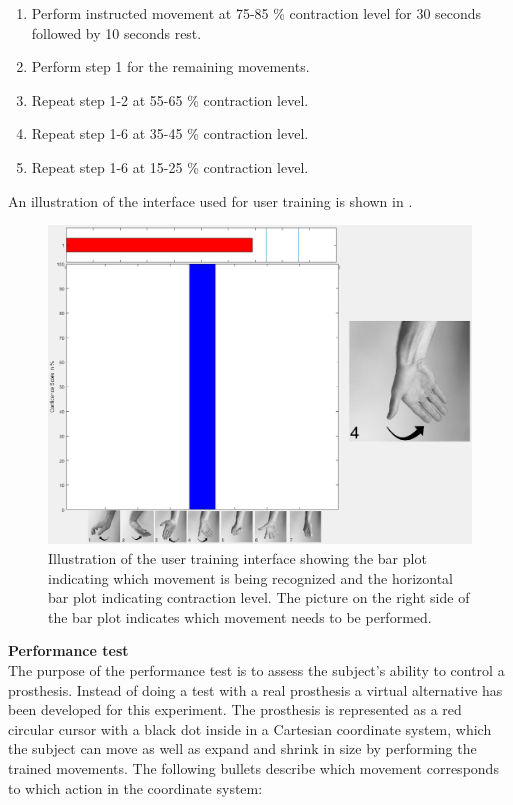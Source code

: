 \begin{enumerate}
	\item Perform instructed movement at 75-85 \% contraction level for 30 seconds followed by 10 seconds rest.
	\item Perform step 1 for the remaining movements.
	\item Repeat step 1-2 at 55-65 \% contraction level.
	\item Repeat step 1-6 at 35-45 \% contraction level.
	\item Repeat step 1-6 at 15-25 \% contraction level.
\end{enumerate} 

An illustration of the interface used for user training is shown in .

\begin{figure}[H]                 
	\includegraphics[width=.8\textwidth]{figures/xBackground/usertraincontrolGUI}  
	\caption{Illustration of the user training interface showing the bar plot indicating which movement is being recognized and the horizontal bar plot indicating contraction level. The picture on the right side of the bar plot indicates which movement needs to be performed.}
	\label{fig:usertraincontrolGUI} 
\end{figure}

\textbf{Performance test} \\
The purpose of the performance test is to assess the subject's ability to control a prosthesis. Instead of doing a test with a real prosthesis a virtual alternative has been developed for this experiment. The prosthesis is represented as a red circular cursor with a black dot inside in a Cartesian coordinate system, which the subject can move as well as expand and shrink in size by performing the trained movements. The following bullets describe which movement corresponds to which action in the coordinate system:

